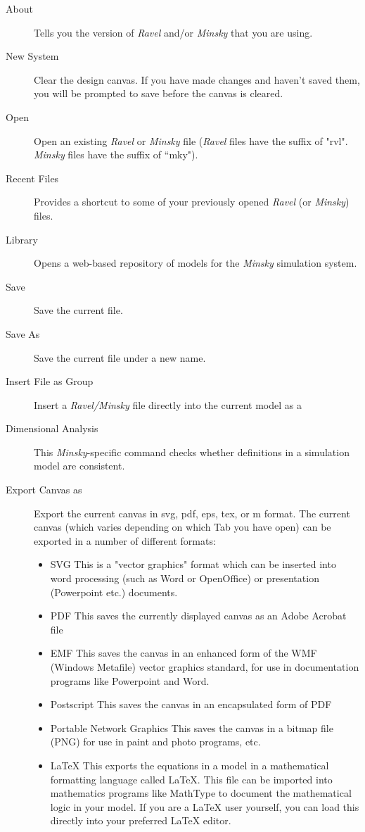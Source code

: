 \label{File}
\begin{description}
\item [{About}] Tells you the version of \emph{Ravel} and/or \emph{Minsky}
that you are using.
\item [{New System}] Clear the design canvas. If you have made changes
and haven't saved them, you will be prompted to save before the canvas
is cleared.
\item [{Open}] Open an existing \emph{Ravel} or \emph{Minsky} file (\emph{Ravel}
files have the suffix of "rvl". \emph{Minsky} files have the suffix
of ``mky").
\item [{Recent Files}] \label{recentfiles} Provides a shortcut to some
of your previously opened \emph{Ravel} (or \emph{Minsky}) files.
\item [{Library}] Opens a web-based repository of models for the \emph{Minsky}
simulation system.
\item [{Save}] Save the current file.
\item [{Save As}] Save the current file under a new name.
\item [{Insert File as Group}] Insert a \emph{Ravel/Minsky} file directly
into the current model as a 
\item [{Dimensional Analysis}] This \emph{Minsky}-specific command checks
whether definitions in a simulation model are consistent.
\item [{Export Canvas as}] Export the current canvas in svg, pdf, eps,
tex, or m format. The current canvas (which varies depending on which
Tab you have open) can be exported in a number of different formats:
\begin{itemize}
\item SVG This is a "vector graphics" format which can be inserted into
word processing (such as Word or OpenOffice) or presentation (Powerpoint
etc.) documents. 
\item PDF This saves the currently displayed canvas as an Adobe Acrobat
file 
\item EMF This saves the canvas in an enhanced form of the WMF (Windows
Metafile) vector graphics standard, for use in documentation programs
like Powerpoint and Word. 
\item Postscript This saves the canvas in an encapsulated form of PDF 
\item Portable Network Graphics This saves the canvas in a bitmap file (PNG)
for use in paint and photo programs, etc. 
\item LaTeX This exports the equations in a model in a mathematical formatting
language called LaTeX. This file can be imported into mathematics
programs like MathType to document the mathematical logic in your
model. If you are a LaTeX user yourself, you can load this directly
into your preferred LaTeX editor.


\end{itemize}
\end{description}
